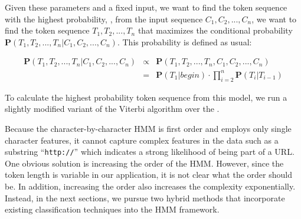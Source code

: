 Given these parameters and a fixed input, we want to find the token
sequence with the highest probability, \ie{}, from the input sequence 
$C_1, C_2, ..., C_n$, we want to find the token sequence 
$T_1, T_2, ..., T_n$ 
that maximizes the conditional probability
$\mathbf{P}(T_1, T_2, ..., T_n|C_1, C_2, ..., C_n)$.
This probability is defined as usual:

\begin{eqnarray}
\mathbf{P}(T_1, T_2, ..., T_n|C_1, C_2, ..., C_n) & \propto & \mathbf{P}(T_1, T_2, ..., T_n, C_1, C_2, ..., C_n) \nonumber \\
& = & \mathbf{P}(T_1|begin) \cdot
\prod_{i=2}^{n}{\mathbf{P}(T_i|T_{i-1})}
\end{eqnarray}

To calculate the highest probability token sequence from this
model, we run a slightly modified variant of the Viterbi 
algorithm over the \seqset.

Because the character-by-character HMM is first order and employs only 
single character features, it cannot capture complex features
in the data such as  
a substring ``{\tt http://}'' which indicates a strong likelihood 
of being part of a URL.
One obvious solution is increasing the order of the HMM.  However, since
the token length is variable in our application, it is not clear what
the order should be.  In addition, increasing the order also increases
the complexity exponentially.  Instead, in the next sections, we pursue
two hybrid methods that incorporate existing classification techniques
into the HMM framework.

